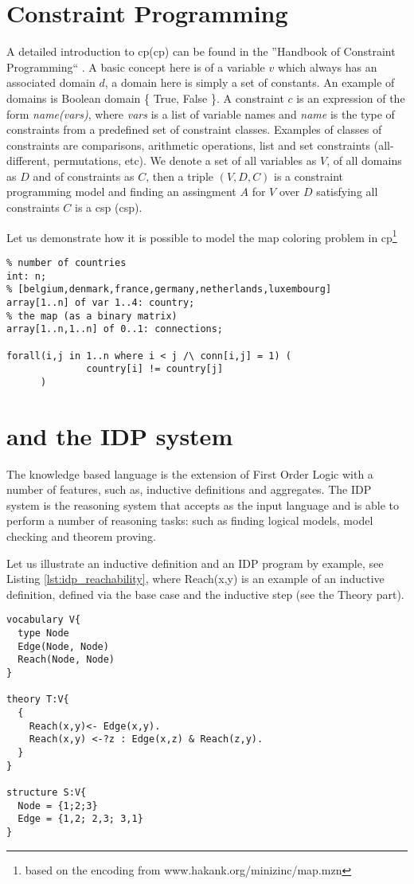 \section{Constraint Programming}
A detailed introduction to \acrlong{cp}(\acrshort{cp}) can be found in the ''Handbook of Constraint Programming`` \parencite{handbookcp}. A basic concept here is of a variable $v$ which always has an associated domain $d$, a domain here is simply a set of constants. An example of domains is Boolean domain \{ True, False \}. A constraint $c$ is an expression of the form \textit{name(vars)}, where \textit{vars} is a list of variable names and \textit{name} is the type of constraints from a predefined set of constraint classes. Examples of classes of constraints are comparisons,   arithmetic operations, list and set constraints (all-different, permutations, etc). We denote a set of all variables as $V$, of all domains as $D$ and of constraints as $C$, then a triple $(V,D,C)$ is a constraint programming model and finding an assingment $A$ for $V$ over $D$ satisfying all constraints $C$ is a \acrlong{csp} (\acrshort{csp}).

Let us demonstrate how it is possible to model the map coloring problem in \acrshort{cp}\footnote{based on the encoding from www.hakank.org/minizinc/map.mzn}
\begin{lstlisting}
% number of countries
int: n; 
% [belgium,denmark,france,germany,netherlands,luxembourg]
array[1..n] of var 1..4: country; 
% the map (as a binary matrix)
array[1..n,1..n] of 0..1: connections; 

forall(i,j in 1..n where i < j /\ conn[i,j] = 1) (
              country[i] != country[j]
      )
\end{lstlisting}



\section{\fod and the IDP system}
The knowledge based language \fod is the extension of First Order Logic with a number of features, such as, inductive definitions and aggregates. The IDP system \parencite{idppaper} is the reasoning system that accepts as the input \fod language and is able to perform a number of reasoning tasks: such as finding logical models, model checking and theorem proving.

Let us illustrate an inductive definition and an IDP program by example, see Listing \ref{lst:idp_reachability}, where Reach(x,y) is an example of an inductive definition, defined via the base case and the inductive step (see the Theory part).
\begin{lstlisting}[caption=An example of an inductive definition in FO(.) and of an IDP program,label=lst:idp_reachability]
vocabulary V{
  type Node
  Edge(Node, Node)
  Reach(Node, Node)
}

theory T:V{
  { 
    Reach(x,y)<- Edge(x,y).
    Reach(x,y) <-?z : Edge(x,z) & Reach(z,y).
  }
}

structure S:V{
  Node = {1;2;3}
  Edge = {1,2; 2,3; 3,1} 
}
\end{lstlisting}

